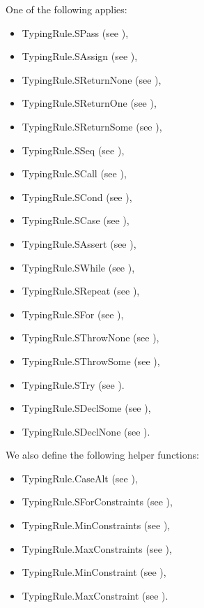 \documentclass{book}
\begin{document}
One of the following applies:
\begin{itemize}
  \item TypingRule.SPass (see ),
  \item TypingRule.SAssign (see ),
  \item TypingRule.SReturnNone (see ),
  \item TypingRule.SReturnOne (see ),
  \item TypingRule.SReturnSome (see ),
  \item TypingRule.SSeq (see ),
  \item TypingRule.SCall (see ),
  \item TypingRule.SCond (see ),
  \item TypingRule.SCase (see ),
  \item TypingRule.SAssert (see ),
  \item TypingRule.SWhile (see ),
  \item TypingRule.SRepeat (see ),
  \item TypingRule.SFor (see ),
  \item TypingRule.SThrowNone (see ),
  \item TypingRule.SThrowSome (see ),
  \item TypingRule.STry (see ).
  \item TypingRule.SDeclSome (see ),
  \item TypingRule.SDeclNone (see ).
\end{itemize}

We also define the following helper functions:
\begin{itemize}
  \item TypingRule.CaseAlt (see ),
  \item TypingRule.SForConstraints (see ),
  \item TypingRule.MinConstraints (see ),
  \item TypingRule.MaxConstraints (see ),
  \item TypingRule.MinConstraint (see ),
  \item TypingRule.MaxConstraint (see ).
\end{itemize}
\end{document}
